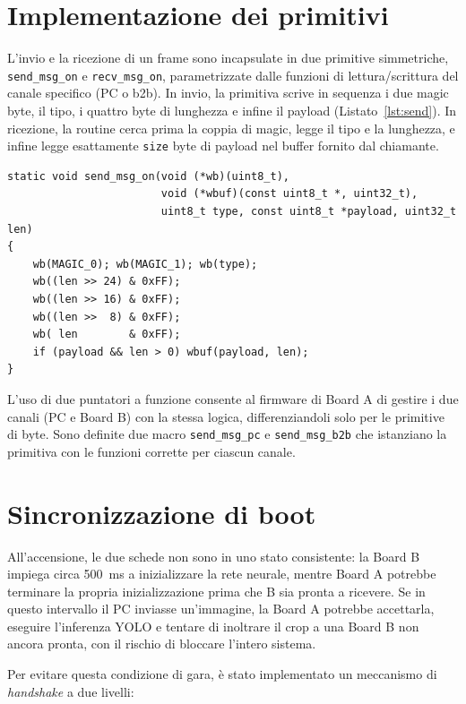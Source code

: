 \section{Implementazione dei primitivi}
\label{sec:primitivi}

L'invio e la ricezione di un frame sono incapsulate in due primitive simmetriche, \texttt{send\_msg\_on} e \texttt{recv\_msg\_on}, parametrizzate dalle funzioni di lettura/scrittura del canale specifico (PC o b2b). In invio, la primitiva scrive in sequenza i due magic byte, il tipo, i quattro byte di lunghezza e infine il payload (Listato~\ref{lst:send}). In ricezione, la routine cerca prima la coppia di magic, legge il tipo e la lunghezza, e infine legge esattamente \texttt{size} byte di payload nel buffer fornito dal chiamante.

\begin{lstlisting}[style=stileC, caption={Primitiva generica per l'invio di un frame.}, label={lst:send}]
static void send_msg_on(void (*wb)(uint8_t),
                        void (*wbuf)(const uint8_t *, uint32_t),
                        uint8_t type, const uint8_t *payload, uint32_t len)
{
    wb(MAGIC_0); wb(MAGIC_1); wb(type);
    wb((len >> 24) & 0xFF);
    wb((len >> 16) & 0xFF);
    wb((len >>  8) & 0xFF);
    wb( len        & 0xFF);
    if (payload && len > 0) wbuf(payload, len);
}
\end{lstlisting}

L'uso di due puntatori a funzione consente al firmware di Board A di gestire i due canali (PC e Board B) con la stessa logica, differenziandoli solo per le primitive di byte. Sono definite due macro \texttt{send\_msg\_pc} e \texttt{send\_msg\_b2b} che istanziano la primitiva con le funzioni corrette per ciascun canale.

\section{Sincronizzazione di boot}
\label{sec:sync-boot}

All'accensione, le due schede non sono in uno stato consistente: la Board B impiega circa 500~ms a inizializzare la rete neurale, mentre Board A potrebbe terminare la propria inizializzazione prima che B sia pronta a ricevere. Se in questo intervallo il PC inviasse un'immagine, la Board A potrebbe accettarla, eseguire l'inferenza YOLO e tentare di inoltrare il crop a una Board B non ancora pronta, con il rischio di bloccare l'intero sistema.

Per evitare questa condizione di gara, è stato implementato un meccanismo di \textit{handshake} a due livelli:

